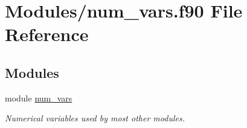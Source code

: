 \hypertarget{num__vars_8f90}{}\section{Modules/num\+\_\+vars.f90 File Reference}
\label{num__vars_8f90}
\subsection*{Modules}
\begin{DoxyCompactItemize}
\item 
module \hyperlink{namespacenum__vars}{num\+\_\+vars}
\begin{DoxyCompactList}\small\item\em Numerical variables used by most other modules. \end{DoxyCompactList}\end{DoxyCompactItemize}
